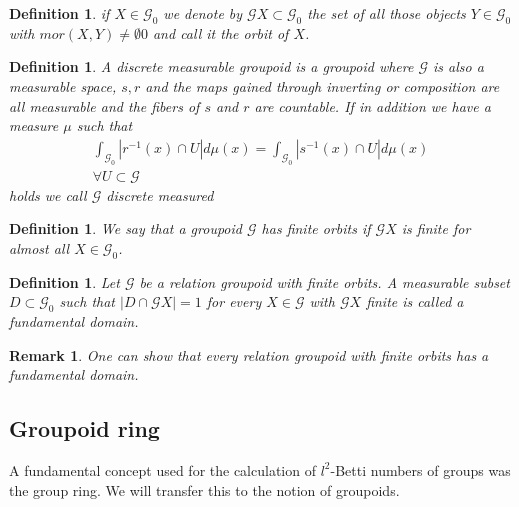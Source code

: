 \documentclass[12pt,a4paper]{scrartcl}
\newtheorem{Definition}[Theorem]{Definition}
\newtheorem{Remark}[Theorem]{Remark}
\numberwithin{equation}{section}
\newcommand{\2}{\mathbb{Z} / 2 \mathbb{Z}}
\newcommand{\G}{\mathcal{G}}
\newcommand{\1}{\bar{1}}
\newcommand{\0}{\bar{0}}
\begin{document}
\begin{Definition}
	if $X \in \G_0$ we denote by $\G X \subset \G_0$ the set of all those objects $Y \in \G_0$ with $mor(X, Y) \neq \emptyset0$ and call it the orbit of $X$.
\end{Definition}
\begin{Definition}
	A discrete measurable groupoid is a groupoid where $\mathcal{G}$ is also a measurable space, $s, r$ and the maps gained through inverting or composition are all measurable and the fibers of $s$ and $r$ are countable.
	If in addition we have a measure $\mu$ such that 
	\begin{align*}
		\int_{\mathcal{G}_0} |r^{-1}(x) \cap U| d\mu(x) = \int_{\mathcal{G}_0} |s^{-1}(x) \cap U| d\mu(x) \\ \forall U \subset \mathcal{G}
	\end{align*}
	holds we call $\mathcal{G}$ discrete measured
\end{Definition}
\begin{Definition}
	We say that a groupoid $\G$ has finite orbits if $\G X$ is finite for almost all $X \in \G_0$.
\end{Definition}
\begin{Definition}
	Let $\G$ be a relation groupoid with finite orbits. A measurable subset $D \subset \G_0$ such that $|D \cap \G X| = 1$ for every $X \in \G$ with $\G X$ finite is called a fundamental domain.
\end{Definition}
\begin{Remark}
	One can show that every relation groupoid with finite orbits has a fundamental domain.
\end{Remark}

\subsection{Groupoid ring}
A fundamental concept used for the calculation of $l^2$-Betti numbers of groups was the group ring. We will transfer this to the notion of groupoids.
\end{document}

